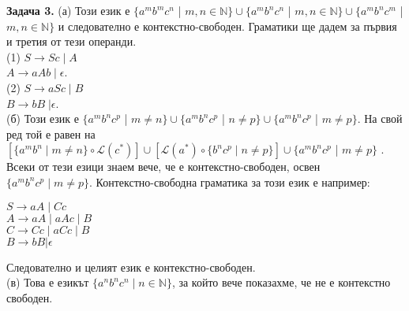 \documentclass{article}
\begin{document}
    \textbf{Задача 3.} (а) Този език е $\{a^mb^mc^n$ | $m,n \in \mathbb{N}\} \cup \{a^mb^nc^n$ | $m,n \in \mathbb{N}\} \cup \{a^mb^nc^m$ | $m,n \in \mathbb{N}\}$
    и следователно е контекстно-свободен. Граматики ще дадем за първия и третия от тези операнди. \\
    (1) $S \rightarrow Sc \; | \; A$ \\
    \hspace{15pt}$A \rightarrow aAb \; | \; \epsilon$. \\
    (2) $S \rightarrow aSc \; | \; B$ \\
    \hspace{15pt}$B \rightarrow bB \; | \epsilon$. \\
    \vspace{5pt}
    (б) Този език е $\{a^mb^nc^p$ | $m \neq n\} \cup \{a^mb^nc^p$ | $n \neq p\} \cup \{a^mb^nc^p$ | $m \neq p\}$.
    На свой ред той е равен на $[\{a^mb^n \; | \; m \neq n\} \circ \mathscr{L}(c^*)] \cup [\mathscr{L}(a^*) \circ \{b^nc^p \; | \; n \neq p\}] \cup \{a^mb^nc^p$ | $m \neq p\}$ 
    . Всеки от тези езици знаем вече, че е контекстно-свободен, освен $\{a^mb^nc^p \; | \; m \neq p\}$. 
    Контекстно-свободна граматика за този език е например: \\
    \begin{center}
    $S \rightarrow aA \; | \; Cc$ \\
    $A \rightarrow aA \; | \; aAc \; | \; B$ \\
    $C \rightarrow Cc \; | \; aCc \; | \; B$ \\
    $B \rightarrow bB | \epsilon$ \\
    \end{center}
    Следователно и целият език е контекстно-свободен. \\ 
    \vspace{5pt}
    (в) Това е езикът $\{a^nb^nc^n \; | \; n \in \mathbb{N}\}$, за който вече показахме,
    че не е контекстно свободен. \\
    \vspace{5pt}
\end{document}

